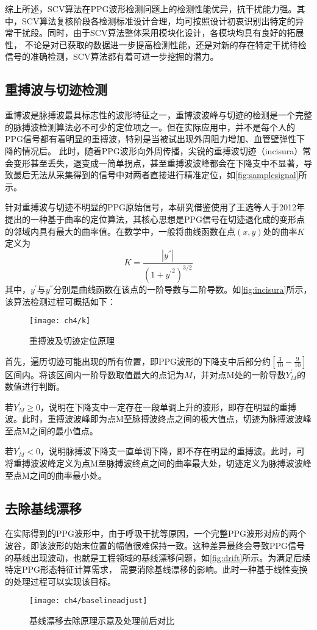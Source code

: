 综上所述，SCV算法在PPG波形检测问题上的检测性能优异，抗干扰能力强。其中，SCV算法复核阶段各检测标准设计合理，均可按照设计初衷识别出特定的异常干扰段。同时，由于SCV算法整体采用模块化设计，各模块均具有良好的拓展性，
不论是对已获取的数据进一步提高检测性能，还是对新的存在特定干扰待检信号的准确检测，SCV算法都有着可进一步挖掘的潜力。

\subsection{重搏波与切迹检测}
重博波是脉搏波最具标志性的波形特征之一，重博波波峰与切迹的检测是一个完整的脉搏波检测算法必不可少的定位项之一\cite{Wang2012}。但在实际应用中，并不是每个人的PPG信号都有着明显的重搏波，特别是当被试出现外周阻力增加、血管壁弹性下降的情况后\cite{mmt}。
此时，随着PPG波形向外周传播，尖锐的重搏波切迹（incisura）常会变形甚至丢失，退变成一简单拐点，甚至重搏波波峰都会在下降支中不显著，导致最后无法从采集得到的信号中对两者直接进行精准定位，如\autoref{fig:samplesignal}所示。

针对重搏波与切迹不明显的PPG原始信号，本研究借鉴使用了王选等人于2012年提出的一种基于曲率的定位算法\cite{Wang2012}，其核心思想是PPG信号在切迹退化成的变形点的邻域内具有最大的曲率值。在数学中，一般将曲线函数在点$(x,y)$处的曲率$K$定义为
\begin{equation}
    \label{equ:curvature}
    K=\frac{|y^{''}|}{{(1+{y^{'}}^2)}^{3/2}}
\end{equation}
其中，$y^{'}$与$y^{''}$分别是曲线函数在该点的一阶导数与二阶导数。如\autoref{fig:incisura}所示，该算法检测过程可概括如下：
\begin{figure}[htbp]
    \centering
    \texttt{[image: ch4/k]}
    \caption{\label{fig:incisura}重搏波及切迹定位原理}
\end{figure}

首先，遍历切迹可能出现的所有位置，即PPG波形的下降支中后部分约$[\frac{3}{10}-\frac{9}{10}]$区间内。将该区间内一阶导数取值最大的点记为$M$，并对点M处的一阶导数$Y_M^{'}$的数值进行判断。

若$Y_M^{'}\ge 0$，说明在下降支中一定存在一段单调上升的波形，即存在明显的重搏波。此时，重搏波波峰即为点M至脉搏波终点之间的极大值点，切迹为脉搏波波峰至点M之间的最小值点。

若$Y_M^{'}<0$，说明脉搏波下降支一直单调下降，即不存在明显的重搏波。此时，可将重搏波波峰定义为点M至脉搏波终点之间的曲率最大处，切迹定义为脉搏波波峰至点M之间的曲率最小处。
\subsection{去除基线漂移}
在实际得到的PPG波形中，由于呼吸干扰等原因，一个完整PPG波形对应的两个波谷，即该波形的始末位置的幅值很难保持一致。这种差异最终会导致PPG信号的基线出现波动，也就是工程领域的基线漂移问题，如\autoref{fig:drift}所示。为满足后续特定PPG形态特征计算需求，
需要消除基线漂移的影响。此时一种基于线性变换的处理过程可以实现该目标。
\begin{figure}[htbp]
    \centering
    \texttt{[image: ch4/baselineadjust]}
    \caption{\label{fig:drift}基线漂移去除原理示意及处理前后对比}
\end{figure}

